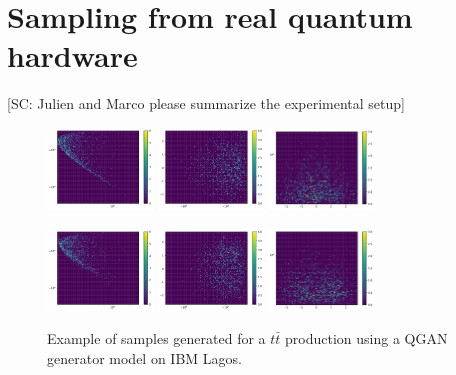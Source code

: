 \documentclass[twocolumn,preprintnumbers,superscriptaddress]{revtex4-2}
\begin{document}
\section{Sampling from real quantum hardware}
\label{sec:deployment}

{\color{red}[SC: Julien and Marco please summarize the experimental setup]}

\begin{figure}
  \includegraphics[width=0.25\textwidth]{plots/hardware_1k/ibm_lagos/s-t_REAL_1000_100.pdf}%
  \includegraphics[width=0.25\textwidth]{plots/hardware_1k/ibm_lagos/t-y_REAL_1000_100.pdf}%
  \includegraphics[width=0.25\textwidth]{plots/hardware_1k/ibm_lagos/y-s_REAL_1000_100.pdf}

  \includegraphics[width=0.25\textwidth]{plots/hardware_1k/ibm_lagos/s-t_FAKE_1000_100_3_5_2_10000_128_0.5_1024.pdf}%
  \includegraphics[width=0.25\textwidth]{plots/hardware_1k/ibm_lagos/t-y_FAKE_1000_100_3_5_2_10000_128_0.5_1024.pdf}%
  \includegraphics[width=0.25\textwidth]{plots/hardware_1k/ibm_lagos/y-s_FAKE_1000_100_3_5_2_10000_128_0.5_1024.pdf}

  \caption{\label{fig:3dgauss}Example of samples generated for a $t\bar{t}$
  production using a QGAN generator model on IBM Lagos.}
\end{figure}
\end{document}

